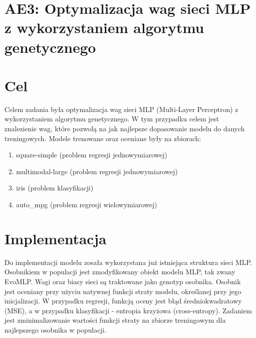 \documentclass{article}
\begin{document}
\section*{AE3: Optymalizacja wag sieci MLP z wykorzystaniem algorytmu genetycznego}
\section*{Cel}
Celem zadania była optymalizacja wag sieci MLP (Multi-Layer Perceptron) z wykorzystaniem algorytmu genetycznego. W tym przypadku celem jest znalezienie wag, które pozwolą na jak najlepsze dopasowanie modelu do danych treningowych. Modele trenowane oraz oceniane były na zbiorach:
\begin{enumerate}
    \item square-simple (problem regresji jednowymiarowej)
    \item multimodal-large (problem regresji jednowymiarowej)
    \item iris (problem klasyfikacji)
    \item auto\_mpg (problem regresji wielowymiarowej)
\end{enumerate}

\section*{Implementacja}
Do implementacji modelu zosała wykorzystana już istniejąca struktura sieci MLP. Osobnikiem w populacji jest zmodyfikowany obiekt modelu MLP, tak zwany EvoMLP. Wagi oraz biasy sieci są traktowane jako genotyp osobnika. Osobnik jest oceniany przy użyciu natywnej funkcji straty modelu, określanej przy jego inicjalizacji. W przypadku regresji, funkcją oceny jest błąd średniokwadratowy (MSE), a w przypadku klasyfikacji - entropia krzyżowa (cross-entropy). Zadaniem jest zminimalizowanie wartości funkcji straty na zbiorze treningowym dla najlepszego osobnika w populacji.
\end{document}
